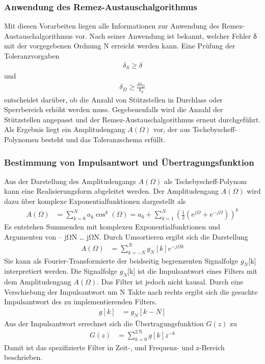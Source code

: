 \subsubsection{Anwendung des Remez-Austauschalgorithmus}\label{sec:anwendung-des-remez-austauschalgorithmus}

Mit diesen Vorarbeiten liegen alle Informationen zur Anwendung des Remez-Austauschalgorithmus vor. Nach seiner Anwendung ist bekannt, welcher Fehler δ mit der vorgegebenen Ordnung N erreicht werden kann. Eine Prüfung der Toleranzvorgaben
\begin{align}
\delta_{S} \geq \delta \label{eq:9.151}
\end{align}
und
\begin{align}
\delta_{D} \geq \frac{\delta  \delta_{D}}{\delta_{S}} \label{eq:9.152}
\end{align}
entscheidet darüber, ob die Anzahl von Stützstellen in Durchlass oder Sperrbereich erhöht werden muss. Gegebenenfalls wird die Anzahl der Stützstellen angepasst und der Remez-Austauschalgorithmus erneut durchgeführt. Als Ergebnis liegt ein Amplitudengang \(A(Ω)\) vor, der aus Tschebyscheff-Polynomen besteht und das Toleranzschema erfüllt.

\subsubsection{Bestimmung von Impulsantwort und Übertragungsfunktion}\label{sec:bestimmung-von-impulsantwort-und-uxfcbertragungsfunktion}

Aus der Darstellung des Amplitudengangs \(A(Ω)\) als Tschebyscheff-Polynom kann eine Realisierungsform abgeleitet werden. Der Amplitudengang \(A(Ω)\) wird dazu über komplexe Exponentialfunktionen dargestellt als
\begin{align}
A(\Omega) &= \sum\limits_{k = 0}^{N}{a_{k}  \cos^{k}(\Omega)} = a_{0} + \sum\limits_{k = 1}^{N}\left( \frac{1}{2}  \left( e^{j  \Omega} + e^{- j  \Omega} \right) \right)^{k} \label{eq:9.153}
\end{align}
Es entstehen Summenden mit komplexen Exponentialfunktionen und Argumenten von -- jΩN \ldots{} jΩN. Durch Umsortieren ergibt sich die Darstellung
\begin{align}
A(\Omega) &= \sum\limits_{k = - N}^{N}{g_{N}[ k]  e^{- j  \Omega  k}} \label{eq:9.154}
\end{align}
Sie kann als Fourier-Transformierte der beidseitig begrenzenten Signalfolge \(g_{N}\){[}k{]} interpretiert werden. Die Signalfolge \(g_{N}\){[}k{]} ist die Impulsantwort eines Filters mit dem Amplitudengang \(A(Ω)\). Das Filter ist jedoch nicht kausal. Durch eine Verschiebung der Impulsantwort um N Takte nach rechts ergibt sich die gesuchte Impulsantwort des zu implementierenden Filters.
\begin{align}
g[ k] &= g_{N}[ k - N] \label{eq:9.155}
\end{align}
Aus der Impulsantwort errechnet sich die Übertragungsfunktion \(G(z)\) zu
\begin{align}
G(z) &= \sum\limits_{k = 0}^{\qty{2}{\newton}}{g[ k]  z^{- k}} \label{eq:9.156}
\end{align}
Damit ist das spezifizierte Filter in Zeit-, und Frequenz- und z-Bereich beschrieben.

